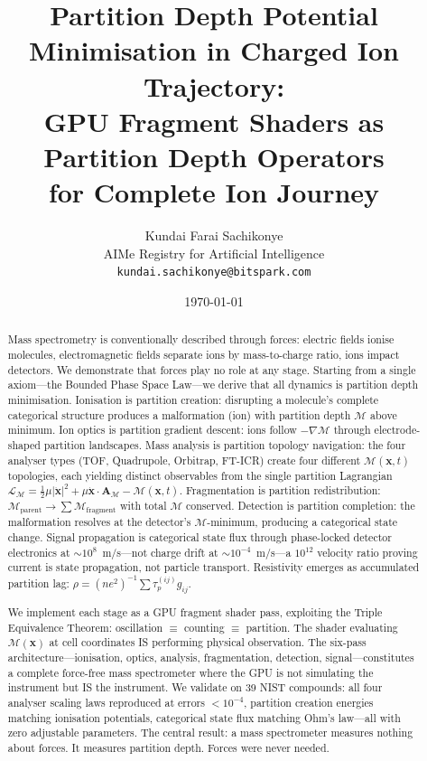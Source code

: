 \documentclass[11pt,twocolumn,a4paper]{article}
\theoremstyle{definition}
\theoremstyle{remark}
\newcommand{\Depth}{\mathcal{M}}
\newcommand{\partinert}{\mu}
\newcommand{\taup}{\tau_p}
\newcommand{\Apartition}{\mathbf{A}_{\mathcal{M}}}
\newcommand{\Lagr}{\mathcal{L}}
\begin{document}
\title{\textbf{Partition Depth Potential Minimisation in Charged Ion Trajectory: \\
GPU Fragment Shaders as Partition Depth Operators \\
for Complete Ion Journey}}

\author{
Kundai Farai Sachikonye\\[0.3em]
AIMe Registry for Artificial Intelligence\\[0.3em]
\texttt{kundai.sachikonye@bitspark.com}
}

\date{\today}

\maketitle

\begin{abstract}
Mass spectrometry is conventionally described through forces: electric fields ionise molecules, electromagnetic fields separate ions by mass-to-charge ratio, ions impact detectors. We demonstrate that forces play no role at any stage. Starting from a single axiom---the Bounded Phase Space Law---we derive that all dynamics is partition depth minimisation. Ionisation is partition creation: disrupting a molecule's complete categorical structure produces a malformation (ion) with partition depth $\Depth$ above minimum. Ion optics is partition gradient descent: ions follow $-\nabla\Depth$ through electrode-shaped partition landscapes. Mass analysis is partition topology navigation: the four analyser types (TOF, Quadrupole, Orbitrap, FT-ICR) create four different $\Depth(\mathbf{x},t)$ topologies, each yielding distinct observables from the single partition Lagrangian $\Lagr_\Depth = \frac{1}{2}\partinert|\dot{\mathbf{x}}|^2 + \partinert\dot{\mathbf{x}}\cdot\Apartition - \Depth(\mathbf{x},t)$. Fragmentation is partition redistribution: $\Depth_{\mathrm{parent}} \to \sum \Depth_{\mathrm{fragment}}$ with total $\Depth$ conserved. Detection is partition completion: the malformation resolves at the detector's $\Depth$-minimum, producing a categorical state change. Signal propagation is categorical state flux through phase-locked detector electronics at $\sim 10^8$~m/s---not charge drift at $\sim 10^{-4}$~m/s---a $10^{12}$ velocity ratio proving current is state propagation, not particle transport. Resistivity emerges as accumulated partition lag: $\rho = (ne^2)^{-1}\sum \taup^{(ij)} g_{ij}$.

We implement each stage as a GPU fragment shader pass, exploiting the Triple Equivalence Theorem: oscillation $\equiv$ counting $\equiv$ partition. The shader evaluating $\Depth(\mathbf{x})$ at cell coordinates IS performing physical observation. The six-pass architecture---ionisation, optics, analysis, fragmentation, detection, signal---constitutes a complete force-free mass spectrometer where the GPU is not simulating the instrument but IS the instrument. We validate on 39 NIST compounds: all four analyser scaling laws reproduced at errors $<10^{-4}$, partition creation energies matching ionisation potentials, categorical state flux matching Ohm's law---all with zero adjustable parameters. The central result: a mass spectrometer measures nothing about forces. It measures partition depth. Forces were never needed.


\end{abstract}
\end{document}
